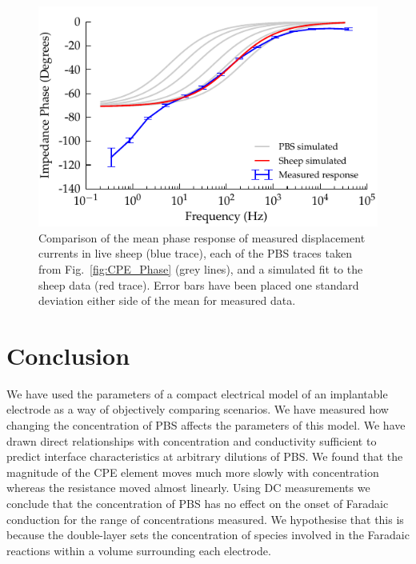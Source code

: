 \documentclass[journal, a4paper]{IEEEtran}
\begin{document}
\begin{figure}
    \begin{center}
        \includegraphics{graphics/displacement-withSheep_impedanceVsFrequency_phase}
    \end{center}
    \caption{Comparison of the mean phase response of measured displacement currents in live sheep (blue trace), each of the PBS traces taken from Fig.~\ref{fig:CPE_Phase} (grey lines), and a simulated fit to the sheep data (red trace). Error bars have been placed one standard deviation either side of the mean for measured data.}
    \label{fig:displacement_sheepCPEPhase}
\end{figure}





\section{Conclusion}
\label{sect:conclusion}
We have used the parameters of a compact electrical model of an implantable electrode as a way of objectively comparing scenarios.
We have measured how changing the concentration of PBS affects the parameters of this model.
We have drawn direct relationships with concentration and conductivity sufficient to predict interface characteristics at arbitrary dilutions of PBS.
We found that the magnitude of the CPE element moves much more slowly with concentration whereas the resistance moved almost linearly.
Using DC measurements we conclude that the concentration of PBS has no effect on the onset of Faradaic conduction for the range of concentrations measured.
We hypothesise that this is because the double-layer sets the concentration of species involved in the Faradaic reactions within a volume surrounding each electrode.
\end{document}
